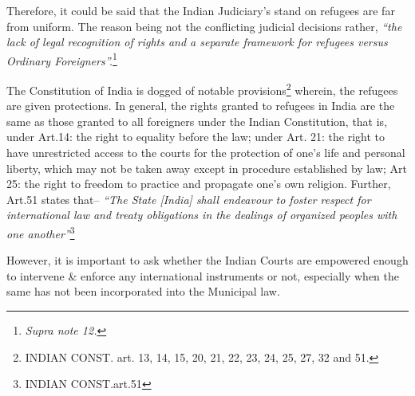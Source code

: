 \begin{multicols}{2}
\noi
Therefore, it could be said that the Indian Judiciary’s stand on refugees are far from uniform.
The reason being not the conflicting judicial decisions rather, \textit{“the lack of legal recognition of
rights and a separate framework for refugees versus Ordinary Foreigners”.}\footnote{\textit{Supra note 12.}}

\vspace{-.2cm}


\vspace{-.2cm}

\noi
The Constitution of India is dogged of notable provisions\footnote{INDIAN CONST. art. 13, 14, 15, 20, 21, 22, 23, 24, 25, 27, 32 and 51.} wherein, the refugees are given protections. In general, the rights granted to refugees in India are the same as those granted to
all foreigners under the Indian Constitution, that is, under Art.14: the right to equality before
the law; under Art. 21: the right to have unrestricted access to the courts for the protection of
one's life and personal liberty, which may not be taken away except in procedure established
by law; Art 25: the right to freedom to practice and propagate one’s own religion. Further,
Art.51 states that– \textit{“The State [India] shall endeavour to foster respect for international law
and treaty obligations in the dealings of organized peoples with one another”}\footnote{INDIAN CONST.art.51}

\noi
However, it is important to ask whether the Indian Courts are empowered enough to intervene
\& enforce any international instruments or not, especially when the same has not been
incorporated into the Municipal law.


\end{multicols}
